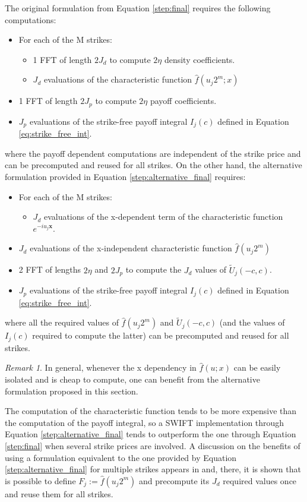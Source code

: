 \documentclass[12,twoside]{mammeTFM}
\theoremstyle{definition}
\theoremstyle{remark}
\newtheorem{remark}[thm]{Remark}
\begin{document}
The original formulation from Equation \ref{step:final} requires the following computations: 
\begin{itemize}
\item For each of the M strikes:
\begin{itemize}
\item 1 FFT of length $2J_d$ to compute $2\eta$ density coefficients.
\item $J_d$ evaluations of the characteristic function $\hat{f}(u_j 2^m;x)$
\end{itemize}
\item 1 FFT of length $2J_p$ to compute $2\eta$ payoff coefficients.
\item $J_p$ evaluations of the strike-free payoff integral $I_j(c)$ defined in Equation \ref{eq:strike_free_int}.
\end{itemize}
where the payoff dependent computations are independent of the strike price and can be precomputed and reused for all strikes.
On the other hand, the alternative formulation provided in Equation \ref{step:alternative_final} requires:
\begin{itemize}
\item For each of the M strikes:
\begin{itemize}
\item $J_d$ evaluations of the x-dependent term of the characteristic function $e^{-iu_j \boldsymbol{x}}$.
\end{itemize}
\item $J_d$ evaluations of the x-independent characteristic function $\hat{f}(u_j 2^m)$
\item 2 FFT of lengths $2 \eta$ and $2J_p$ to compute the $J_d$ values of $\tilde{U}_j(-c,c)$.
\item $J_p$ evaluations of the strike-free payoff integral $I_j(c)$ defined in Equation \ref{eq:strike_free_int}.
\end{itemize}
where all the required values of $\hat{f}(u_j 2^m)$ and $\tilde{U}_j(-c,c)$ (and the values of $I_j(c)$ required to compute the latter) can be precomputed and reused for all strikes.

\begin{remark}
In general, whenever the x dependency in $\hat{f}(u; x)$ can be easily isolated and is cheap to compute, one can benefit from the alternative formulation proposed in this section.
\end{remark}

The computation of the characteristic function tends to be more expensive than the computation of the payoff integral, so a SWIFT implementation through Equation \ref{step:alternative_final} tends to outperform the one through Equation \ref{step:final} when several strike prices are involved. A discussion on the benefits of using a formulation equivalent to the one provided by Equation \ref{step:alternative_final} for multiple strikes appears in \cite{Ortiz-Gracia2016} and, there, it is shown that is possible to define $F_j := \hat{f}(u_j 2^m)$ and precompute its $J_d$ required values once and reuse them for all strikes.
\end{document}
